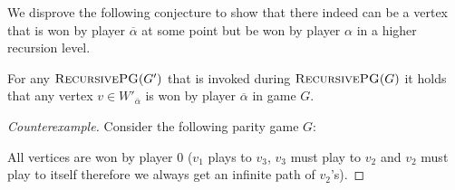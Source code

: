 We disprove the following conjecture to show that there indeed can be a vertex that is won by player $\overline{\alpha}$ at some point but be won by player $\alpha$ in a higher recursion level.
\begin{conjecture}[Disproven]
	For any $\textsc{RecursivePG}(G')$ that is invoked during $\textsc{RecursivePG}(G)$ it holds that any vertex $v \in W'_{\overline{\alpha}}$ is won by player $\overline{\alpha}$ in game $G$.
\begin{proof}[Counterexample]
 Consider the following parity game $G$:\\
	\begin{center}
	\end{center}

	All vertices are won by player $0$ ($v_1$ plays to $v_3$, $v_3$ must play to $v_2$ and $v_2$ must play to itself therefore we always get an infinite path of $v_2$'s).
	

\end{proof}
\end{conjecture}
